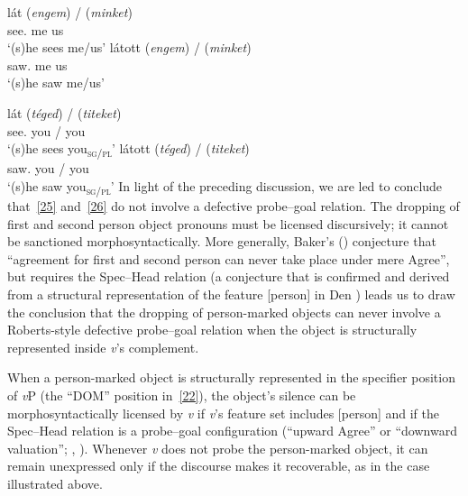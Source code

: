 \documentclass[output=paper]{langsci/langscibook}
\begin{document}
\begin{refcontext}
\ea \label{25}
    \ea \gll lát (\emph{engem}) / (\emph{minket})\\
    see.\Indef{} \phantom{(}me {} \phantom{(}us\\
    \glt \enquote*{(s)he sees me/us}
    \ex \gll látott (\emph{engem}) / (\emph{minket})\\
    saw.\Indef{} \phantom{(}me {} \phantom{(}us\\
    \glt \enquote*{(s)he saw me/us}
    \z
\z

\ea \label{26}
    \ea \gll lát (\emph{téged}) / (\emph{titeket})\\
    see.\Indef{} \phantom{(}you\textsubscript{\Sg{}} / \phantom{(}you\textsubscript{\Pl}\\
    \glt \enquote*{(s)he sees you\textsubscript{\textsc{sg/pl}}}
    \ex \gll látott (\emph{téged}) / (\emph{titeket})\\
    saw.\Indef{} \phantom{(}you\textsubscript{\Sg{}} / \phantom{(}you\textsubscript{\Pl}\\
    \glt \enquote*{(s)he saw you\textsubscript{\textsc{sg/pl}}}
    \z
\z
In light of the preceding discussion, we are led to conclude that~\eqref{25}
and~\eqref{26} do not involve a defective probe--goal relation. The dropping of
first and second person object pronouns must be licensed discursively; it
cannot be sanctioned morphosyntactically. More generally, Baker's
(\citeyear[877, fn.\ 3]{baker11}) conjecture that \enquote{agreement for first and
second person can never take place under mere Agree}, but requires the
Spec--Head relation (a conjecture that is confirmed and derived from a
structural representation of the feature [person] in Den
\citealt{dikkengetegratalk}) leads us to draw the conclusion that the dropping
of person-marked objects can never involve a Roberts-style defective probe--goal
relation when the object is structurally represented inside \emph{v}'s
complement.

When a person-marked object is structurally represented in the specifier
position of \emph{v}P (the \enquote{DOM} position in~\eqref{22}), the object's
silence can be morphosyntactically licensed by \emph{v} if \emph{v}'s feature
set includes [person] and if the Spec--Head relation is a probe--goal
configuration (\enquote{upward Agree} or \enquote{downward valuation};
\citealt{BjoZei2019}, \citealt{premingerpolinsky}). Whenever \emph{v} does not
probe the person-marked object, it can remain unexpressed only if the discourse
makes it recoverable, as in the  case illustrated above.


\end{refcontext}
\end{document}
